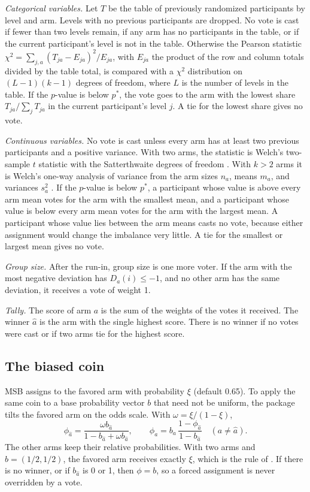 \documentclass[bib]{statapress}
\begin{document}
\emph{Categorical variables.} Let $T$ be the table of previously randomized participants by
level and arm. Levels with no previous participants are dropped. No vote is
cast if fewer than two levels remain, if any arm has no participants in the
table, or if the current participant's level is not in the table. 
Otherwise the Pearson statistic $\chi^2 = \sum_{j,a} (T_{ja} - E_{ja})^2 / E_{ja}$, with
$E_{ja}$ the product of the row and column totals divided by the table total,
is compared with a $\chi^2$ distribution on $(L - 1)(k - 1)$ degrees of
freedom, where $L$ is the number of levels in the table. If the $p$-value is
below $p^\ast$, the vote goes to the arm with the lowest share
$T_{ja} / \sum_j T_{ja}$ in the 
current participant's level $j$. A tie for the
lowest share gives no vote.

\emph{Continuous variables.} No vote is cast unless every arm has at least two
previous participants and a positive variance. With two arms, the statistic is
Welch's two-sample $t$ statistic with the Satterthwaite degrees of freedom
\citep{welch1947,satterthwaite1946}. With $k > 2$ arms it is Welch's one-way
analysis of variance from the arm sizes $n_a$, means $m_a$, and variances
$s_a^2$ \citep{welch1951}. If the $p$-value is below $p^\ast$, a participant
whose value is above every arm mean votes for the arm with the smallest mean,
and a participant whose value is below every arm mean votes for the arm with the
largest mean. A participant whose value lies between the arm means casts no
vote, because either assignment would change the imbalance very little. A tie
for the smallest or largest mean gives no vote.

\emph{Group size.} After the run-in, group size is one more voter. If the arm
with the most negative deviation has $D_a(i) \le -1$, and no other arm has the
same deviation, it receives a vote of weight 1.

\emph{Tally.} The score of arm $a$ is the sum of the weights of the votes it
received. The winner $\hat a$ is the arm with the single highest score. There is
no winner if no votes were cast or if two arms tie for the highest score.

\subsection{The biased coin}

MSB assigns to the favored arm with probability $\xi$ (default 0.65). To apply
the same coin to a base probability vector $b$ that need not be uniform, the
package tilts the favored arm on the odds scale. With $\omega = \xi / (1 - \xi)$,
\begin{equation}
\phi_{\hat a} = \frac{\omega b_{\hat a}}{1 - b_{\hat a} + \omega b_{\hat a}},
\qquad
\phi_a = b_a \, \frac{1 - \phi_{\hat a}}{1 - b_{\hat a}} \quad (a \ne \hat a).
\label{eq:tilt}
\end{equation}
The other arms keep their relative probabilities. With two arms and
$b = (1/2, 1/2)$, the favored arm receives exactly $\xi$, which is the rule of
\citet{zhao2015msb}. If there is no winner, or if $b_{\hat a}$ is 0 or 1, then
$\phi = b$, so a forced assignment is never overridden by a vote.
\end{document}
